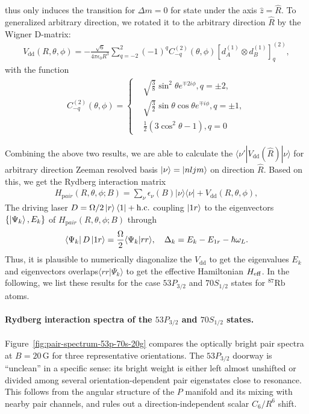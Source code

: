 thus only induces the transition for $\Delta m = 0$ for state under the axis $\hat{z} = \hat{R}$. To generalized arbitrary direction, we rotated it to the arbitrary direction $\hat{R}$ by the Wigner D-matrix:
\begin{align}
    V_{\mathrm{dd}}(R,\theta, \phi)=- \frac{\sqrt{6}}{4\pi\epsilon_0 R^3} \sum_{q=-2}^{2} (-1)^q C_{-q}^{(2)}(\theta, \phi) [d_A^{(1)} \otimes d_B^{(1)}]_{q}^{(2)},
\end{align}
with the function
\begin{align}
C_{-q}^{(2)}(\theta, \phi)=\left\{\begin{aligned}
&\sqrt{\frac{3}{8}} \sin^2 \theta e^{ \mp 2i\phi}, q=\pm 2, \\
&\sqrt{\frac{3}{2}} \sin \theta \cos \theta e^{\mp i\phi}, q=\pm 1, \\
&\frac{1}{2} (3 \cos^2 \theta - 1), q = 0
\end{aligned}
\right.
\end{align}

Combining the above two results, we are able to calculate the $\langle \nu'|V_{\mathrm{dd}}(\hat{R})|\nu\rangle$ for arbitrary direction Zeeman resolved basis $\ket{\nu} = \ket{nljm}$ on direction $\hat{R}$.
Based on this, we get the Rydberg interaction matrix
\begin{align}
    H_{\mathrm pair}(R,\theta,\phi;B)=\sum_{\nu}\epsilon_{\nu}(B)|\nu\rangle\langle\nu|+V_{\mathrm{dd}}(R,\theta,\phi),
\end{align}
The driving laser $D = {\Omega}/{2}\ket{r}\bra{1} + \mathrm{h.c.}$ coupling $\ket{1r}$ to the eigenvectors $\{\ket{\Psi_k}, E_k\}$ of $H_{\mathrm pair}(R,\theta,\phi;B)$ through 
\begin{align}
    \bra{\Psi_k}D\ket{1r} = \frac{\Omega}{2}\langle \Psi_k|rr \rangle, \quad \Delta_k = E_k - E_{1r} - \hbar\omega_L.
\end{align}
Thus, it is plausible to numerically diagonalize the $V_{\mathrm{dd}}$ to get the eigenvalues $E_k$ and eigenvectors overlaps$\langle rr|{\Psi_k}\rangle$ to get the effective Hamiltonian $H_{\rm eff}$. In the following, we list these results for the case $53P_{3/2}$ and $70S_{1/2}$ states for $^{87}\mathrm{Rb}$ atoms.

\paragraph{Rydberg interaction spectra of the $53P_{3/2}$ and $70S_{1/2}$ states.}
Figure~\ref{fig:pair-spectrum-53p-70s-20g} compares the optically bright pair
spectra at $B=20\,\mathrm{G}$ for three representative orientations.  The
$53P_{3/2}$ doorway is ``unclean'' in a specific sense: its bright weight is
either left almost unshifted or divided among several orientation-dependent
pair eigenstates close to resonance.  This follows from the angular structure
of the $P$ manifold and its mixing with nearby pair channels, and rules out a
direction-independent scalar $C_6/R^6$ shift.

